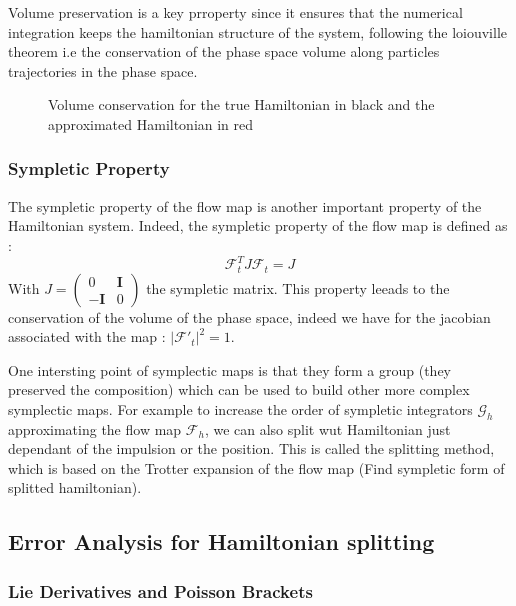 \documentclass[ansiapaper]{report}
\begin{document}
\begin{multicols}{3}
	Volume preservation is a key prroperty since it ensures that the numerical integration keeps the hamiltonian structure of the system, following the loiouville theorem i.e the conservation of the phase space volume along particles trajectories in the phase space.

	\begin{figure}[H]
		\def\svgwidth{\linewidth}
		
		\caption{Volume conservation for the true Hamiltonian in black and the approximated Hamiltonian in red}
		\vspace{0.15cm}
	\end{figure}

	\subsubsection{Sympletic Property}
	The sympletic property of the flow map is another important property of the Hamiltonian system. Indeed, the sympletic property of the flow map is defined as :
	$$ \mathcal{F}_t^T J \mathcal{F}_t = J$$
	With $J = \begin{pmatrix}
			0           & \textbf{I} \\
			-\textbf{I} & 0
		\end{pmatrix}$ the sympletic matrix. This property leeads to the conservation of the volume of the phase space, indeed we have  for the jacobian associated with the map : $\lvert \mathcal{F'}_t\rvert^2 = 1 $.

	One intersting point of symplectic maps is that they form a group (they preserved the composition) which can be used to build other more complex symplectic maps. For example to increase the order of sympletic integrators $\mathcal{G}_h$  approximating the flow map $\mathcal{F}_h$, we can also split wut Hamiltonian just dependant of the impulsion or the position. This is called the splitting method, which is based on the Trotter expansion of the flow map (Find sympletic form of splitted hamiltonian).

	\subsection{Error Analysis for Hamiltonian splitting}


	\subsubsection{Lie Derivatives and Poisson Brackets}


\end{multicols}
\end{document}
